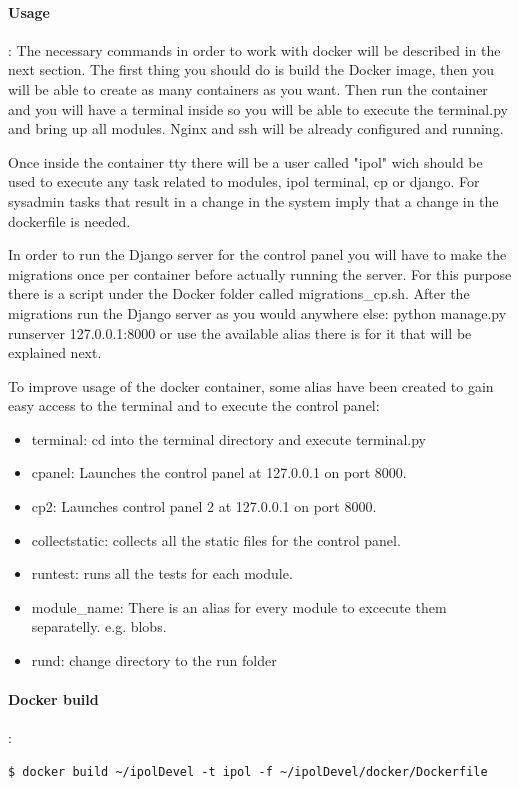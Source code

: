 \documentclass[a4paper,12pt]{article}
\begin{document}
\paragraph{Usage}:
The necessary commands in order to work with docker will be described in the next section. The first thing you should do is
build the Docker image, then you will be able to create as many containers as you want. Then run the container and you
will have a terminal inside so you will be able to execute the terminal.py and bring up all modules. Nginx and ssh will be already
configured and running.

Once inside the container tty there will be a user called "ipol" wich should be used to execute any task related to modules, ipol terminal, 
cp or django. For sysadmin tasks that result in a change in the system imply that a change in the dockerfile is needed.
 
In order to run the Django server for the control panel you will have to make the migrations once per
container before actually running the server. For this purpose there is a script under the Docker folder called migrations\_cp.sh.
 After the migrations run the Django server as you would anywhere else: python manage.py runserver 127.0.0.1:8000 or use the available 
 alias there is for it that will be explained next.
 
 To improve usage of the docker container, some alias have been created to gain easy access to the terminal and to execute the control panel:
 \begin{itemize}
 	\item terminal: cd into the terminal directory and execute terminal.py
 	\item cpanel: Launches the control panel at 127.0.0.1 on port 8000.
 	\item cp2: Launches control panel 2 at 127.0.0.1 on port 8000.
 	\item collectstatic: collects all the static files for the control panel.
 	\item runtest: runs all the tests for each module.
 	\item module\_name: There is an alias for every module to excecute them separatelly. e.g. blobs.
 	\item rund: change directory to the run folder
 \end{itemize}


\paragraph{Docker build}:\\
\begin{lstlisting}[firstnumber=1,breaklines]
  $ docker build ~/ipolDevel -t ipol -f ~/ipolDevel/docker/Dockerfile
\end{lstlisting}
\end{document}
